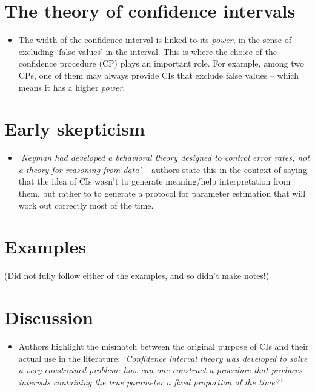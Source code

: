 \documentclass[
]{book}
\providecommand{\tightlist}{%
  \setlength{\itemsep}{0pt}\setlength{\parskip}{0pt}}
\begin{document}
\hypertarget{the-theory-of-confidence-intervals}{%
\section{The theory of confidence intervals}\label{the-theory-of-confidence-intervals}}

\begin{itemize}
\tightlist
\item
  The width of the confidence interval is linked to its \emph{power}, in the sense of excluding `false values' in the interval. This is where the choice of the confidence procedure (CP) plays an important role. For example, among two CPs, one of them may always provide CIs that exclude false values -- which means it has a higher \emph{power}.
\end{itemize}

\hypertarget{early-skepticism}{%
\section{Early skepticism}\label{early-skepticism}}

\begin{itemize}
\tightlist
\item
  \emph{`Neyman had developed a behavioral theory designed to control error
  rates, not a theory for reasoning from data'} -- authors state this in the context of saying that the idea of CIs wasn't to generate meaning/help interpretation from them, but rather to to generate a protocol for parameter estimation that will work out correctly most of the time.
\end{itemize}

\hypertarget{examples}{%
\section{Examples}\label{examples}}

(Did not fully follow either of the examples, and so didn't make notes!)

\hypertarget{discussion-8}{%
\section{Discussion}\label{discussion-8}}

\begin{itemize}
\tightlist
\item
  Authors highlight the mismatch between the original purpose of CIs and their actual use in the literature: \emph{`Confidence
  interval theory was developed to solve a very constrained
  problem: how can one construct a procedure that produces
  intervals containing the true parameter a fixed proportion
  of the time?'}
\end{itemize}
\end{document}
